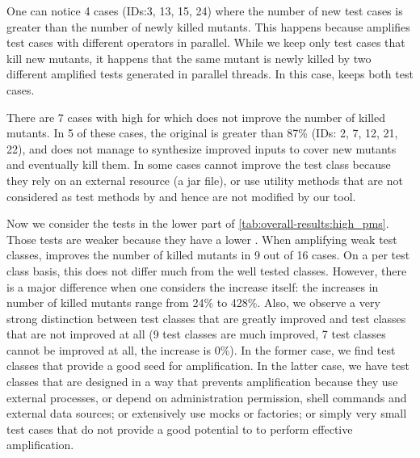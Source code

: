 One can notice 4 cases (IDs:3, 13, 15, 24) where the number of new test cases is greater than the number of newly killed mutants. This happens because \dspot{} amplifies test cases with different operators in parallel. While we keep only test cases that kill new mutants, it happens that the same mutant is newly killed by two different amplified tests generated in parallel threads. In this case, \dspot{} keeps both test cases.

There are 7 cases with high \ms for which \dspot{} does not improve the number of killed mutants. In 5 of these cases, the original \ms is greater than 87\% (IDs: 2, 7, 12, 21, 22), and \dspot{} does not manage to synthesize improved inputs to cover new mutants and eventually kill them. In some cases \dspot{} cannot improve the test class because they rely on an external resource (a jar file), or use utility methods that are not considered as test methods by \dspot and hence are not modified by our tool.

Now we consider the tests in the lower part of \autoref{tab:overall-results:high_pms}. %
Those tests are weaker because they have a lower \ms. 
When amplifying  weak test classes,  \dspot{} improves the number of killed mutants in  9 out of 16 cases. On a per test class basis, this does not differ much from the well tested classes. However, there is a major difference when one considers the increase itself: the increases in number of killed mutants range from 24\% to 428\%. Also, we observe a very strong distinction between test classes that are greatly improved and test classes that are not improved at all (9 test classes are much improved, 7 test classes cannot be improved at all, the increase is 0\%). In the former case, we find test classes that provide a good seed for amplification. In the latter case, we have test classes that are designed in a way that prevents amplification because they use external processes, or depend on administration permission, shell commands and external data sources; or extensively use mocks or factories; or simply very small test cases that do not provide a good potential to \dspot to perform effective amplification.

